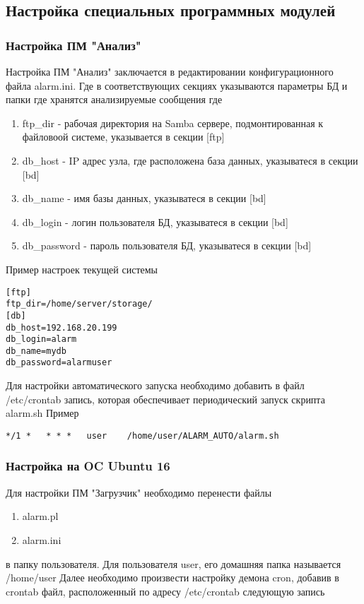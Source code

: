 \documentclass[12pt]{article}[a4paper,14pt,russian]
\begin{document}
	\subsection {Настройка специальных программных модулей}
	\subsubsection{Настройка ПМ "Анализ"}
	Настройка ПМ "Анализ" заключается в редактировании конфигурационного файла alarm.ini. Где в соответствующих секциях указываются параметры БД и папки где хранятся анализируемые сообщения 
	где
	\begin{enumerate}
		\item ftp\_dir - рабочая директория на Samba сервере, подмонтированная
		 к файловоой системе, указывается в секции [ftp]
		 \item db\_host - IP адрес узла, где расположена база данных, указыватеся в секции [bd]
		 \item db\_name - имя базы данных, указыватеся в секции [bd]
		 \item db\_login - логин пользователя БД, указыватеся в секции [bd]
		 \item db\_password - пароль пользователя БД, указыватеся в секции [bd]
	\end{enumerate}
	
	Пример настроек текущей системы
\begin{verbatim} 
[ftp]
ftp_dir=/home/server/storage/
[db]
db_host=192.168.20.199
db_login=alarm
db_name=mydb
db_password=alarmuser
\end{verbatim}
Для настройки автоматического запуска необходимо добавить в файл /etc/crontab
запись, которая обеспечивает периодический запуск скрипта alarm.sh
Пример

\begin{verbatim}
*/1 *   * * *   user    /home/user/ALARM_AUTO/alarm.sh
\end{verbatim}

	\subsubsection{Настройка на OC Ubuntu 16}
	Для настройки ПМ "Загрузчик" необходимо перенести файлы
	\begin{enumerate}
	\item alarm.pl
	\item alarm.ini
	\end{enumerate}
	в папку пользователя. Для пользователя user, его домашняя папка называется /home/user
	Далее необходимо произвести настройку демона cron, добавив в crontab файл, расположенный по адресу 
	/etc/crontab
	следующую запись
	
\end{document}
